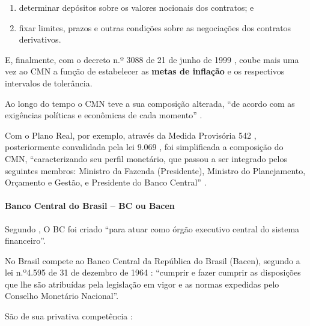 \documentclass[]{article}
\providecommand{\tightlist}{%
  \setlength{\itemsep}{0pt}\setlength{\parskip}{0pt}}
\let\oldparagraph\paragraph
\renewcommand{\paragraph}[1]{\oldparagraph{#1}\mbox{}}
\begin{document}
\begin{enumerate}
\def\labelenumi{\alph{enumi}.}
\tightlist
\item
  determinar depósitos sobre os valores nocionais dos contratos; e
\item
  fixar limites, prazos e outras condições sobre as negociações dos
  contratos derivativos.
\end{enumerate}

E, finalmente, com o decreto n.º 3088 de 21 de junho de 1999
\cite{brasil1999}, coube mais uma vez ao CMN a função de estabelecer as
\textbf{metas de inflação} e os respectivos intervalos de tolerância.

Ao longo do tempo o CMN teve a sua composição alterada, ``de acordo com
as exigências políticas e econômicas de cada momento''
\cite[p.~19]{fortuna2015}.

Com o Plano Real, por exemplo, através da Medida Provisória 542
\cite{brasil1994}, posteriormente convalidada pela lei 9.069
\cite{brasil1995}, foi simplificada a composição do CMN,
``caracterizando seu perfil monetário, que passou a ser integrado pelos
seguintes membros: Ministro da Fazenda (Presidente), Ministro do
Planejamento, Orçamento e Gestão, e Presidente do Banco Central''
\cite[p.~19]{fortuna2015}.

\paragraph{Banco Central do Brasil -- BC ou
Bacen}\label{banco-central-do-brasil-bc-ou-bacen}

Segundo , O BC foi criado ``para atuar
como órgão executivo central do sistema financeiro''.

No Brasil compete ao Banco Central da República do Brasil (Bacen),
segundo a lei n.º4.595 de 31 de dezembro de 1964 \cite{brasil1964c}:
``cumprir e fazer cumprir as disposições que lhe são atribuídas pela
legislação em vigor e as normas expedidas pelo Conselho Monetário
Nacional''.

São de sua privativa competência \cite[p.21]{fortuna2015}:
\end{document}
